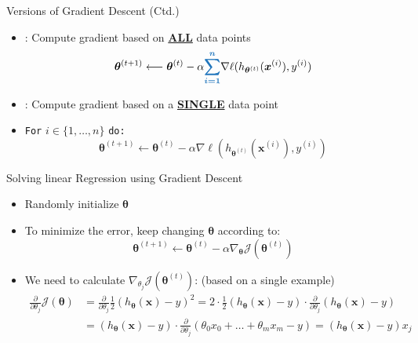 \begin{frame}{Versions of Gradient Descent (Ctd.)}{}
	\begin{itemize}
		\item {}: Compute gradient based on \textbf{\underline{ALL}} data points
		\begin{equation}
			\bm{\theta}^{(t+1)} \longleftarrow \bm{\theta}^{(t)} - \alpha
				\textcolor{myblue1}{\bm{\sum_{i=1}^{n}}} \nabla \ell(h_{\bm{\theta}^{(t)}}(\bm{x}^{(i)}), y^{(i)})
		\end{equation}
		
		\item {}: Compute gradient based on a \textbf{\underline{SINGLE}} data point
		\item \texttt{For} $i \in \{1, \dots, n\}$ \texttt{do:}
		\vspace*{-3mm}
		\begin{equation}
			\bm{\theta}^{(t+1)} \longleftarrow \bm{\theta}^{(t)} - \alpha \nabla \ell(h_{\bm{\theta}^{(t)}}(\bm{x}^{(i)}), y^{(i)})
		\end{equation}
	\end{itemize}
\end{frame}


\begin{frame}{Solving linear Regression using Gradient Descent}{}
	\begin{itemize}
		\item Randomly initialize $\bm{\theta}$
		\item To minimize the error, keep changing $\bm{\theta}$ according to:
		\begin{equation}
			\bm{\theta}^{(t+1)} \longleftarrow \bm{\theta}^{(t)}
				- \alpha \nabla_{\bm{\theta}}\mathcal{J}(\bm{\theta}^{(t)})
		\end{equation}
		\item We need to calculate $\nabla_{\theta_j}\mathcal{J}(\bm{\theta}^{(t)})$: 
			{\footnotesize (based on a single example)}
		{\footnotesize
		\begin{align}
			\frac{\partial}{\partial \theta_j} \mathcal{J}(\bm{\theta})
				&= \frac{\partial}{\partial \theta_j} \frac{1}{2}(h_{\bm{\theta}}(\bm{x}) - y)^2
					= 2 \cdot \frac{1}{2} (h_{\bm{\theta}}(\bm{x}) - y) \cdot \frac{\partial}{\partial \theta_j}
						(h_{\bm{\theta}}(\bm{x}) - y) \\
				&= (h_{\bm{\theta}}(\bm{x}) - y) \cdot \frac{\partial}{\partial \theta_j}
					(\theta_0 x_0 + \dots + \theta_{m} x_{m} - y)
					= \boxed{(h_{\bm{\theta}}(\bm{x}) - y) x_j}
		\end{align}}
	\end{itemize}
\end{frame}


